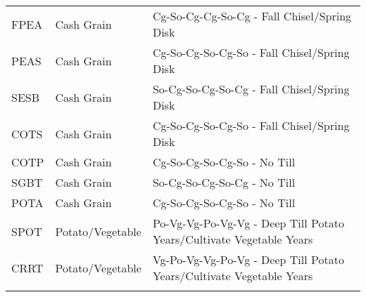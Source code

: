 \begin{landscape}
\begin{longtable}{lll}
  FPEA & Cash Grain & Cg-So-Cg-Cg-So-Cg - Fall Chisel/Spring Disk  \\ 
  PEAS & Cash Grain & Cg-So-Cg-So-Cg-So - Fall Chisel/Spring Disk  \\ 
  SESB & Cash Grain & So-Cg-So-Cg-So-Cg - Fall Chisel/Spring Disk  \\ 
  COTS & Cash Grain & Cg-So-Cg-So-Cg-So - Fall Chisel/Spring Disk  \\ 
  COTP & Cash Grain & Cg-So-Cg-So-Cg-So - No Till  \\ 
  SGBT & Cash Grain & So-Cg-So-Cg-So-Cg - No Till  \\ 
  POTA & Cash Grain & Cg-So-Cg-So-Cg-So - No Till  \\ 
  SPOT & Potato/Vegetable & Po-Vg-Vg-Po-Vg-Vg - Deep Till Potato Years/Cultivate Vegetable Years  \\ 
  CRRT & Potato/Vegetable & Vg-Po-Vg-Vg-Po-Vg - Deep Till Potato Years/Cultivate Vegetable Years  \\ 
\label{tab:lnd_mgt_def}
\end{longtable}
\end{landscape}